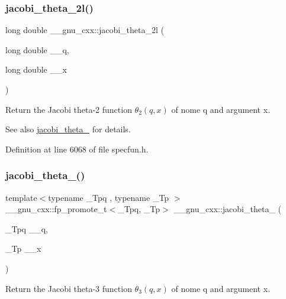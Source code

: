 \subsubsection{\texorpdfstring{jacobi\+\_\+theta\+\_\+2l()}{jacobi\_theta\_2l()}}
{\footnotesize\ttfamily long double \+\_\+\+\_\+gnu\+\_\+cxx\+::jacobi\+\_\+theta\+\_\+2l (\begin{DoxyParamCaption}\item[{long double}]{\+\_\+\+\_\+q,  }\item[{long double}]{\+\_\+\+\_\+x }\end{DoxyParamCaption})\hspace{0.3cm}{\ttfamily [inline]}}

Return the Jacobi theta-\/2 function $ \theta_2(q,x) $ of nome {\ttfamily q} and argument {\ttfamily x}.

\begin{DoxySeeAlso}{See also}
\hyperlink{group__mathsf__gnu_gaf6b13dac1f112a870299d75cb4cf42cc}{jacobi\+\_\+theta\+\_} for details. 
\end{DoxySeeAlso}


Definition at line 6068 of file specfun.\+h.

\mbox{\label{group__mathsf__gnu_gaf4eac2990db1dadba66ae688ceaa6403}} 
\subsubsection{\texorpdfstring{jacobi\+\_\+theta\+\_()}{jacobi\_theta\_3()}}
{\footnotesize\ttfamily template$<$typename \+\_\+\+Tpq , typename \+\_\+\+Tp $>$ \\
\+\_\+\+\_\+gnu\+\_\+cxx\+::fp\+\_\+promote\+\_\+t$<$\+\_\+\+Tpq, \+\_\+\+Tp$>$ \+\_\+\+\_\+gnu\+\_\+cxx\+::jacobi\+\_\+theta\+\_ (\begin{DoxyParamCaption}\item[{\+\_\+\+Tpq}]{\+\_\+\+\_\+q,  }\item[{\+\_\+\+Tp}]{\+\_\+\+\_\+x }\end{DoxyParamCaption})\hspace{0.3cm}{\ttfamily [inline]}}

Return the Jacobi theta-\/3 function $ \theta_3(q,x) $ of nome {\ttfamily q} and argument {\ttfamily x}.

